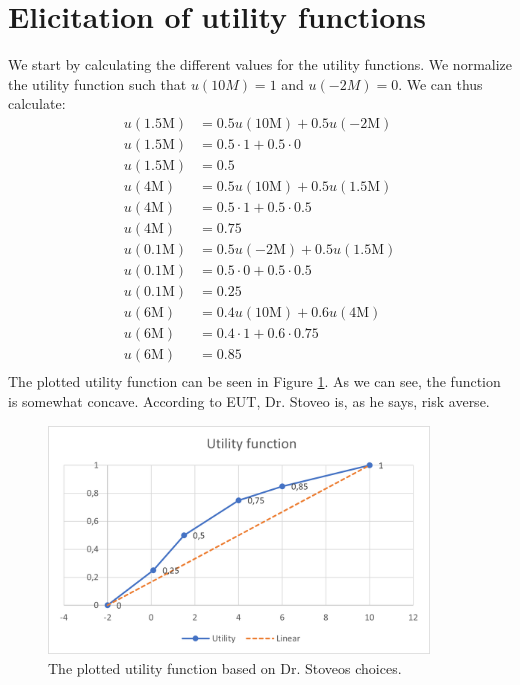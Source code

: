 \documentclass{article}
\begin{document}
\section{Elicitation of utility functions}
	We start by calculating the different values for the utility functions. We normalize the utility function such that $u(10M)=1$ and $u(-2M)=0$. We can thus calculate:
	\begin{align}
		u(1.5\text{M}) &= 0.5u(10\text{M}) + 0.5u(-2\text{M})\\
		u(1.5\text{M}) &= 0.5 \cdot 1 + 0.5 \cdot 0 \\ 
		u(1.5\text{M})&= 0.5 \\
		u(4\text{M}) &= 0.5u(10\text{M}) + 0.5u(1.5\text{M})\\
		u(4\text{M}) &= 0.5 \cdot 1 + 0.5 \cdot 0.5 \\ 
		u(4\text{M})&= 0.75 \\
		u(0.1\text{M}) &= 0.5u(-2\text{M}) + 0.5u(1.5\text{M})\\
		u(0.1\text{M}) &= 0.5 \cdot 0 + 0.5 \cdot 0.5 \\ 
		u(0.1\text{M})&= 0.25 \\
		u(6\text{M}) &= 0.4u(10\text{M}) + 0.6u(4\text{M})\\
		u(6\text{M}) &= 0.4 \cdot 1 + 0.6 \cdot 0.75\\ 
		u(6\text{M})&= 0.85 \\
	\end{align}
	The plotted utility function can be seen in Figure \ref{fig:3}. As we can see, the function is somewhat concave. According to EUT, Dr. Stoveo is, as he says, risk averse.
	\begin{figure}[H]
		\includegraphics[width=0.9\textwidth]{3.png}
		\caption{The plotted utility function based on Dr. Stoveos choices.}
		\label{fig:3}
	\end{figure}
\end{document}
